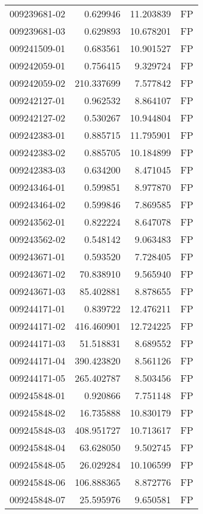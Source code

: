 \begin{tabular}{lrrl}
009239681-02 &    0.629946 &    11.203839 &   FP \\
009239681-03 &    0.629893 &    10.678201 &   FP \\
009241509-01 &    0.683561 &    10.901527 &   FP \\
009242059-01 &    0.756415 &     9.329724 &   FP \\
009242059-02 &  210.337699 &     7.577842 &   FP \\
009242127-01 &    0.962532 &     8.864107 &   FP \\
009242127-02 &    0.530267 &    10.944804 &   FP \\
009242383-01 &    0.885715 &    11.795901 &   FP \\
009242383-02 &    0.885705 &    10.184899 &   FP \\
009242383-03 &    0.634200 &     8.471045 &   FP \\
009243464-01 &    0.599851 &     8.977870 &   FP \\
009243464-02 &    0.599846 &     7.869585 &   FP \\
009243562-01 &    0.822224 &     8.647078 &   FP \\
009243562-02 &    0.548142 &     9.063483 &   FP \\
009243671-01 &    0.593520 &     7.728405 &   FP \\
009243671-02 &   70.838910 &     9.565940 &   FP \\
009243671-03 &   85.402881 &     8.878655 &   FP \\
009244171-01 &    0.839722 &    12.476211 &   FP \\
009244171-02 &  416.460901 &    12.724225 &   FP \\
009244171-03 &   51.518831 &     8.689552 &   FP \\
009244171-04 &  390.423820 &     8.561126 &   FP \\
009244171-05 &  265.402787 &     8.503456 &   FP \\
009245848-01 &    0.920866 &     7.751148 &   FP \\
009245848-02 &   16.735888 &    10.830179 &   FP \\
009245848-03 &  408.951727 &    10.713617 &   FP \\
009245848-04 &   63.628050 &     9.502745 &   FP \\
009245848-05 &   26.029284 &    10.106599 &   FP \\
009245848-06 &  106.888365 &     8.872776 &   FP \\
009245848-07 &   25.595976 &     9.650581 &   FP \\

\end{tabular}
